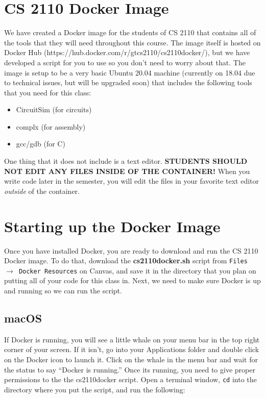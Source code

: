 \section{CS 2110 Docker Image}
We have created a Docker image for the students of CS 2110 that contains all of the tools that they will need throughout this course. The image itself is hosted on Docker Hub (https://hub.docker.com/r/gtcs2110/cs2110docker/), but we have developed a script for you to use so you don’t need to worry about that. The image is setup to be a very basic Ubuntu 20.04 machine (currently on 18.04 due to technical issues, but will be upgraded soon) that includes the following tools that you need for this class:

\begin{itemize}
  \item CircuitSim (for circuits)
  \item complx (for assembly)
  \item gcc/gdb (for C)
\end{itemize}

One thing that it does not include is a text editor. \textbf{STUDENTS SHOULD NOT EDIT ANY FILES INSIDE OF THE CONTAINER!} When you write code later in the semester, you will edit the files in your favorite text editor \emph{outside} of the container.





\section{Starting up the Docker Image}
Once you have installed Docker, you are ready to download and run the CS 2110 Docker image. To do that, download the \textbf{cs2110docker.sh} script from \texttt{Files $\rightarrow$ Docker Resources} on Canvas, and save it in the directory that you plan on putting all of your code for this class in. Next, we need to make sure Docker is up and running so we can run the script.

\subsection{macOS}
If Docker is running, you will see a little whale on your menu bar in the top right corner of your screen. If it isn’t, go into your Applications folder and double click on the Docker icon to launch it. Click on the whale in the menu bar and wait for the status to say ``Docker is running.'' Once its running, you need to give proper permissions to the the cs2110docker script. Open a terminal window, \texttt{cd} into the directory where you put the script, and run the following:

